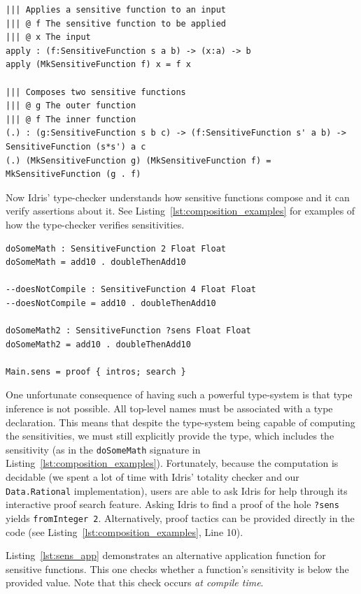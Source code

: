 \documentclass[12pt]{report}
\begin{document}
\begin{lstlisting}[caption={Sensitive function operations},label={lst:sens_fns_ops}]
||| Applies a sensitive function to an input
||| @ f The sensitive function to be applied
||| @ x The input
apply : (f:SensitiveFunction s a b) -> (x:a) -> b
apply (MkSensitiveFunction f) x = f x

||| Composes two sensitive functions
||| @ g The outer function
||| @ f The inner function
(.) : (g:SensitiveFunction s b c) -> (f:SensitiveFunction s' a b) -> SensitiveFunction (s*s') a c
(.) (MkSensitiveFunction g) (MkSensitiveFunction f) = MkSensitiveFunction (g . f)
\end{lstlisting}

Now Idris' type-checker understands how sensitive functions compose and it can verify assertions about it.
See Listing~\ref{lst:composition_examples} for examples of how the type-checker verifies sensitivities.

\begin{lstlisting}[float,caption={Examples of Sensitive Function Composition},label={lst:composition_examples}]
doSomeMath : SensitiveFunction 2 Float Float
doSomeMath = add10 . doubleThenAdd10

--doesNotCompile : SensitiveFunction 4 Float Float
--doesNotCompile = add10 . doubleThenAdd10

doSomeMath2 : SensitiveFunction ?sens Float Float
doSomeMath2 = add10 . doubleThenAdd10

Main.sens = proof { intros; search }
\end{lstlisting}

One unfortunate consequence of having such a powerful type-system is that type inference is not possible.
All top-level names must be associated with a type declaration.
This means that despite the type-system being capable of computing the sensitivities, we must still explicitly provide the type, which includes the sensitivity (as in the \texttt{doSomeMath} signature in Listing~\ref{lst:composition_examples}).
Fortunately, because the computation is decidable (we spent a lot of time with Idris' totality checker and our \texttt{Data.Rational} implementation), users are able to ask Idris for help through its interactive proof search feature.
Asking Idris to find a proof of the hole \texttt{?sens} yields \texttt{fromInteger 2}.
Alternatively, proof tactics can be provided directly in the code (see Listing~\ref{lst:composition_examples}, Line 10).

Listing~\ref{lst:sens_app} demonstrates an alternative application function for sensitive functions.
This one checks whether a function's sensitivity is below the provided value.
Note that this check occurs \textit{at compile time}.
\end{document}
